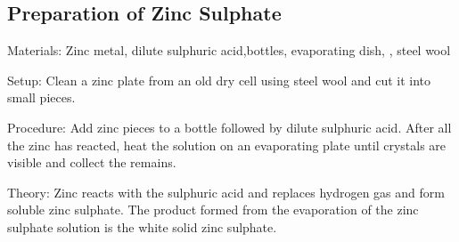 \begin{multicols}{2}
\subsection{Preparation of Zinc Sulphate} 


\begin{description*}
\item[Materials:]{Zinc metal, dilute sulphuric acid,bottles, evaporating dish, , steel wool}
\item[Setup:]{Clean a zinc plate from an old dry cell using steel wool and cut it into small pieces.}
\item[Procedure:]{Add zinc pieces to a bottle followed by dilute sulphuric acid. After all the zinc has reacted, heat the solution on an evaporating plate until crystals are visible and collect the remains.}
\item[Theory:]{Zinc reacts with the sulphuric acid and replaces hydrogen gas and form soluble zinc sulphate. The product formed from the evaporation of the zinc
sulphate solution is the white solid zinc sulphate.}
\end{description*}


\end{multicols}

\vfill
\pagebreak